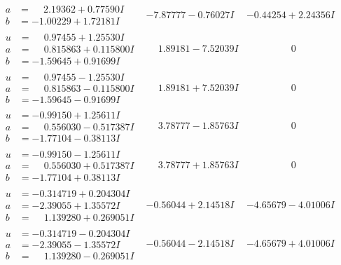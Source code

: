 \documentclass[1p]{elsarticle_modified}
\theoremstyle{definition}
\begin{document}
$$\begin{array}{c|c|c}
\begin{aligned}
a &= \phantom{-}2.19362 + 0.77590 I \\
b &= -1.00229 + 1.72181 I\end{aligned}
 & -7.87777 - 0.76027 I & -0.44254 + 2.24356 I \\ \hline\begin{aligned}
u &= \phantom{-}0.97455 + 1.25530 I \\
a &= \phantom{-}0.815863 + 0.115800 I \\
b &= -1.59645 + 0.91699 I\end{aligned}
 & \phantom{-}1.89181 - 7.52039 I & \phantom{-0.000000 } 0 \\ \hline\begin{aligned}
u &= \phantom{-}0.97455 - 1.25530 I \\
a &= \phantom{-}0.815863 - 0.115800 I \\
b &= -1.59645 - 0.91699 I\end{aligned}
 & \phantom{-}1.89181 + 7.52039 I & \phantom{-0.000000 } 0 \\ \hline\begin{aligned}
u &= -0.99150 + 1.25611 I \\
a &= \phantom{-}0.556030 - 0.517387 I \\
b &= -1.77104 - 0.38113 I\end{aligned}
 & \phantom{-}3.78777 - 1.85763 I & \phantom{-0.000000 } 0 \\ \hline\begin{aligned}
u &= -0.99150 - 1.25611 I \\
a &= \phantom{-}0.556030 + 0.517387 I \\
b &= -1.77104 + 0.38113 I\end{aligned}
 & \phantom{-}3.78777 + 1.85763 I & \phantom{-0.000000 } 0 \\ \hline\begin{aligned}
u &= -0.314719 + 0.204304 I \\
a &= -2.39055 + 1.35572 I \\
b &= \phantom{-}1.139280 + 0.269051 I\end{aligned}
 & -0.56044 + 2.14518 I & -4.65679 - 4.01006 I \\ \hline\begin{aligned}
u &= -0.314719 - 0.204304 I \\
a &= -2.39055 - 1.35572 I \\
b &= \phantom{-}1.139280 - 0.269051 I\end{aligned}
 & -0.56044 - 2.14518 I & -4.65679 + 4.01006 I\\

\end{array}$$
\end{document}
